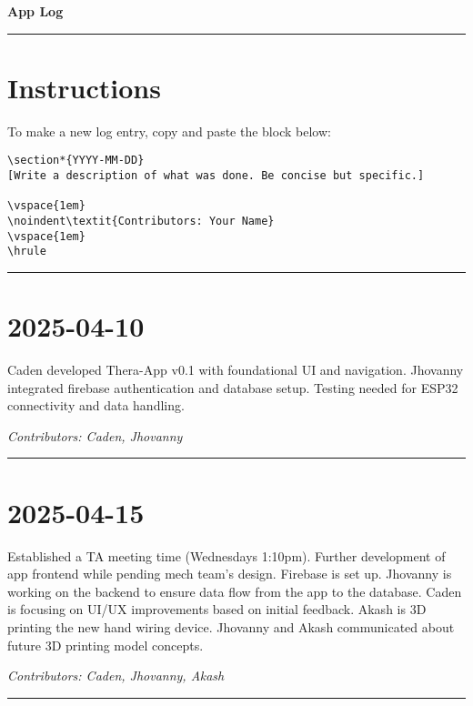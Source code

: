 \documentclass[12pt]{article}
\begin{document}
\begin{center}
    {\Huge\bfseries App Log}
\end{center}
\vspace{1em}
\hrule
\vspace{1em}

\section*{Instructions}
To make a new log entry, copy and paste the block below:

\begin{verbatim}
\section*{YYYY-MM-DD}
[Write a description of what was done. Be concise but specific.]

\vspace{1em}
\noindent\textit{Contributors: Your Name}
\vspace{1em}
\hrule
\end{verbatim}

\vspace{1em}
\hrule
\vspace{1em}


\section*{2025-04-10}
Caden developed Thera-App v0.1 with foundational UI and navigation. Jhovanny integrated firebase authentication and database setup. Testing needed for ESP32 connectivity and data handling.

\vspace{1em}
\noindent\textit{Contributors: Caden, Jhovanny}
\vspace{1em}
\hrule

\section*{2025-04-15}
Established a TA meeting time (Wednesdays 1:10pm). Further development of app frontend while pending mech team's design. Firebase is set up. Jhovanny is working on the backend to ensure data flow from the app to the database. Caden is focusing on UI/UX improvements based on initial feedback.
Akash is 3D printing the new hand wiring device. Jhovanny and Akash communicated about future 3D printing model concepts.

\vspace{1em}
\noindent\textit{Contributors: Caden, Jhovanny, Akash}
\vspace{1em}
\hrule


\end{document}
